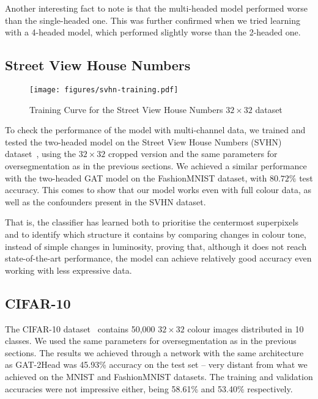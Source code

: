 \documentclass[twocolumn]{article}
\begin{document}
Another interesting fact to note is that the multi-headed model 
performed worse
than the single-headed one. This was further confirmed when we tried learning with a 4-headed model, which performed slightly worse than the 2-headed one.

\subsection{Street View House Numbers}

\begin{figure}
    \centering
    \texttt{[image: figures/svhn-training.pdf]}
    \caption{Training Curve for the Street View House Numbers $32\times32$ dataset}
    \label{fig:svhn-training}
\end{figure}

To check the performance of the model with multi-channel data, we trained and tested the two-headed model on the Street View House Numbers (SVHN) dataset~\cite{netzer2011svhn}, using the $32 \times 32$ cropped version and the same parameters for 
oversegmentation
as in the previous sections. We achieved a similar performance with the two-headed GAT model on the FashionMNIST dataset, with $ 80.72\%$ test accuracy. This comes to show that our model works even with full colour data, as well as the confounders present in the SVHN dataset. 

That is, the classifier has learned both to prioritise the centermost superpixels and to identify which structure it contains by comparing changes in colour tone, instead of simple changes in luminosity, proving that, although it does not reach state-of-the-art performance, the model can achieve relatively good accuracy even 
working with
less expressive data.




\subsection{CIFAR-10}

The CIFAR-10 dataset~\cite{krizhevsky2009cifar} contains 50,000 $32\times 32$ colour images distributed in 10 classes. We used the same parameters for 
oversegmentation
as in the previous sections.
The results we achieved through a network with the same architecture as GAT-2Head was 45.93\% accuracy on the test set -- very distant from what we achieved on the MNIST and FashionMNIST datasets.
The training and validation accuracies were not impressive either, being 58.61\% and 53.40\% respectively. 
\end{document}
